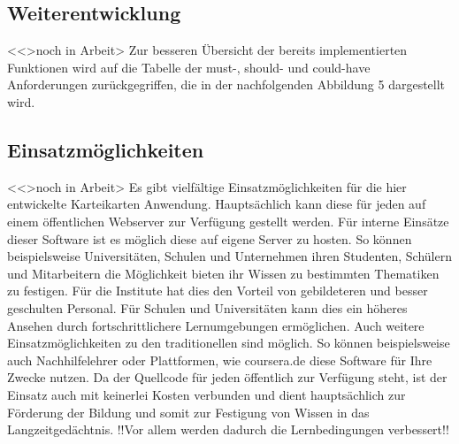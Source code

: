 \subsection{Weiterentwicklung}
<<>noch in Arbeit>
Zur besseren Übersicht der bereits implementierten Funktionen wird auf die Tabelle der must-, should- und could-have Anforderungen zurückgegriffen, die in der nachfolgenden Abbildung 5 dargestellt wird.




\subsection{Einsatzmöglichkeiten}
<<>noch in Arbeit>
Es gibt vielfältige Einsatzmöglichkeiten für die hier entwickelte Karteikarten Anwendung. Hauptsächlich kann diese für jeden auf einem öffentlichen Webserver zur Verfügung gestellt werden. Für interne Einsätze dieser Software ist es möglich diese auf eigene Server zu hosten. So können beispielsweise Universitäten, Schulen und Unternehmen ihren Studenten, Schülern und Mitarbeitern die Möglichkeit bieten ihr Wissen zu bestimmten Thematiken zu festigen. Für die Institute hat dies den Vorteil von gebildeteren und besser geschulten Personal. Für Schulen und Universitäten kann dies ein höheres Ansehen durch fortschrittlichere Lernumgebungen ermöglichen. Auch weitere Einsatzmöglichkeiten zu den traditionellen sind möglich. So können beispielsweise auch Nachhilfelehrer oder Plattformen, wie coursera.de diese Software für Ihre Zwecke nutzen. Da der Quellcode für jeden öffentlich zur Verfügung steht, ist der Einsatz auch mit keinerlei Kosten verbunden und dient hauptsächlich zur Förderung der Bildung und somit zur Festigung von Wissen in das Langzeitgedächtnis. !!Vor allem werden dadurch die Lernbedingungen verbessert!!


